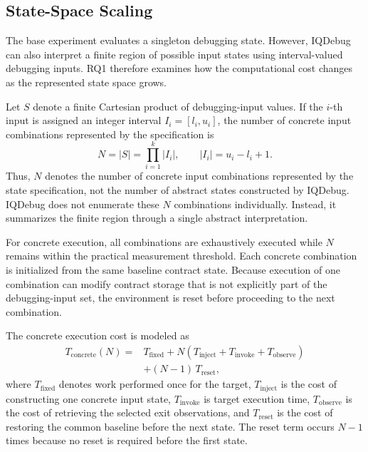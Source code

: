 \documentclass[11pt,oneside]{report}
\theoremstyle{plain}
\theoremstyle{definition}
\theoremstyle{remark}
\begin{document}
\subsection{State-Space Scaling}
\label{subsec:eval:rq1:scaling}

The base experiment evaluates a singleton debugging state. However, IQDebug can also interpret a finite region of possible input states using interval-valued debugging inputs. RQ1 therefore examines how the computational cost changes as the represented state space grows.

Let \(S\) denote a finite Cartesian product of debugging-input values. If the \(i\)-th input is assigned an integer interval \(I_i=[l_i,u_i]\), the number of concrete input combinations represented by the specification is
\[
N
=
|S|
=
\prod_{i=1}^{k}|I_i|,
\qquad
|I_i|
=
u_i-l_i+1.
\]
Thus, \(N\) denotes the number of concrete input combinations represented by the state specification, not the number of abstract states constructed by IQDebug. IQDebug does not enumerate these \(N\) combinations individually. Instead, it summarizes the finite region through a single abstract interpretation.

For concrete execution, all combinations are exhaustively executed while \(N\) remains within the practical measurement threshold. Each concrete combination is initialized from the same baseline contract state. Because execution of one combination can modify contract storage that is not explicitly part of the debugging-input set, the environment is reset before proceeding to the next combination.

The concrete execution cost is modeled as
\[
\begin{aligned}
T_{\mathrm{concrete}}(N)
={} & T_{\mathrm{fixed}}
+ N
\left(
T_{\mathrm{inject}}
+
T_{\mathrm{invoke}}
+
T_{\mathrm{observe}}
\right) \\
& + (N-1)\,T_{\mathrm{reset}},
\end{aligned}
\]
where \(T_{\mathrm{fixed}}\) denotes work performed once for the target, \(T_{\mathrm{inject}}\) is the cost of constructing one concrete input state, \(T_{\mathrm{invoke}}\) is target execution time, \(T_{\mathrm{observe}}\) is the cost of retrieving the selected exit observations, and \(T_{\mathrm{reset}}\) is the cost of restoring the common baseline before the next state. The reset term occurs \(N-1\) times because no reset is required before the first state.
\end{document}
